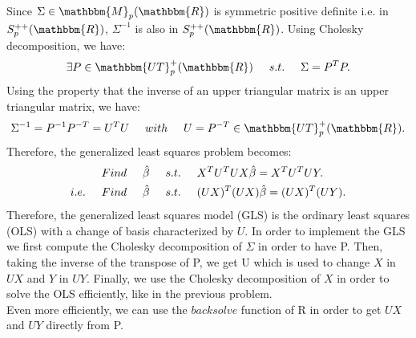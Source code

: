 \documentclass{llncs}\usepackage[]{graphicx}\usepackage[]{color}
\begin{document}
Since $\Sigma \in \mathbbm{M}_{p}(\mathbbm{R})$ is symmetric positive definite i.e. in $S^{++}_{p}(\mathbbm{R})$, ${\Sigma}^{-1}$ is also in $S^{++}_{p}(\mathbbm{R})$. Using Cholesky decomposition, we have:
\begin{equation}
\exists P \in \mathbbm{UT}^{+}_{p}(\mathbbm{R}) \hspace{.5cm}s.t.\hspace{.5cm} {\Sigma}= P^{T}P.
\end{equation}
Using the property that the inverse of an upper triangular matrix is an upper triangular matrix, we have:
\begin{equation}
{\Sigma}^{-1}= P^{-1}P^{-T}=U^{T}U \hspace{.5cm}with\hspace{.5cm} U=P^{-T} \in \mathbbm{UT}^{+}_{p}(\mathbbm{R}).
\end{equation}
Therefore, the generalized least squares problem becomes:
\begin{align}
&Find \hspace{.5cm} \hat{\beta} \hspace{.5cm} s.t. \hspace{.5cm} X^{T}U^{T}UX \hat{\beta}= X^{T}U^{T}UY.\nonumber\\
i.e. \hspace{.5cm} & Find \hspace{.5cm} \hat{\beta} \hspace{.5cm} s.t. \hspace{.5cm} (UX)^{T}(UX) \hat{\beta}= (UX)^{T}(UY).
\end{align}
Therefore, the generalized least squares model (GLS) is the ordinary least squares (OLS) with a change of basis characterized by $U$. In order to implement the GLS we first compute the Cholesky decomposition of $\Sigma$ in order to have P. Then, taking the inverse of the transpose of P, we get U which is used to change $X$ in $UX$ and $Y$ in $UY$. Finally, we use the Cholesky decomposition of $X$ in order to solve the OLS efficiently, like in the previous problem.\\ 
Even more efficiently, we can use the $backsolve$ function of R in order to get $UX$ and $UY$ directly from P.
\end{document}
